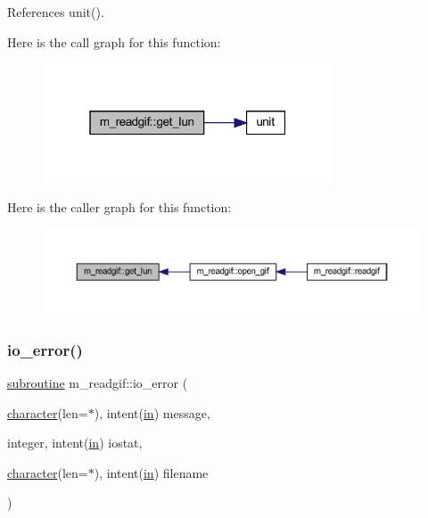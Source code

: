 References unit().

Here is the call graph for this function\+:
\nopagebreak
\begin{figure}[H]
\begin{center}
\leavevmode
\includegraphics[width=244pt]{namespacem__readgif_a7109d632cddcb8d66729d25bbed5c33c_cgraph}
\end{center}
\end{figure}
Here is the caller graph for this function\+:
\nopagebreak
\begin{figure}[H]
\begin{center}
\leavevmode
\includegraphics[width=350pt]{namespacem__readgif_a7109d632cddcb8d66729d25bbed5c33c_icgraph}
\end{center}
\end{figure}
\mbox{\label{namespacem__readgif_ae01d3edbe9e15bf4dd33070581e26fee}} 
\subsubsection{\texorpdfstring{io\+\_\+error()}{io\_error()}}
{\footnotesize\ttfamily \hyperlink{M__stopwatch_83_8txt_acfbcff50169d691ff02d4a123ed70482}{subroutine} m\+\_\+readgif\+::io\+\_\+error (\begin{DoxyParamCaption}\item[{\hyperlink{option__stopwatch_83_8txt_abd4b21fbbd175834027b5224bfe97e66}{character}(len=$\ast$), intent(\hyperlink{M__journal_83_8txt_afce72651d1eed785a2132bee863b2f38}{in})}]{message,  }\item[{integer, intent(\hyperlink{M__journal_83_8txt_afce72651d1eed785a2132bee863b2f38}{in})}]{iostat,  }\item[{\hyperlink{option__stopwatch_83_8txt_abd4b21fbbd175834027b5224bfe97e66}{character}(len=$\ast$), intent(\hyperlink{M__journal_83_8txt_afce72651d1eed785a2132bee863b2f38}{in})}]{filename }\end{DoxyParamCaption})\hspace{0.3cm}{\ttfamily [private]}}

